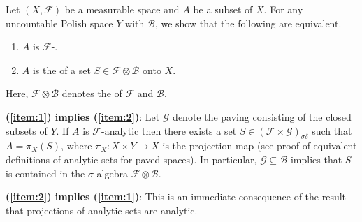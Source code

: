 \documentclass[12pt]{article}
\begin{document}

Let $(X,\mathcal{F})$ be a measurable space and $A$ be a subset of $X$. For any uncountable Polish space $Y$ with  $\mathcal{B}$, we show that the following are equivalent.
\begin{enumerate}
\item\label{item:1} $A$ is $\mathcal{F}$-.
\item\label{item:2} $A$ is the  of a set $S\in\mathcal{F}\otimes\mathcal{B}$ onto $X$.
\end{enumerate}
Here, $\mathcal{F}\otimes\mathcal{B}$ denotes the  of $\mathcal{F}$ and $\mathcal{B}$.

\noindent\textbf{(\ref{item:1}) implies (\ref{item:2})}:
Let $\mathcal{G}$ denote the paving consisting of the closed subsets of $Y$. If $A$ is $\mathcal{F}$-analytic then there exists a set $S\in(\mathcal{F}\times\mathcal{G})_{\sigma\delta}$ such that $A=\pi_X(S)$, where $\pi_X\colon X\times Y\to X$ is the projection map (see proof of equivalent definitions of analytic sets for paved spaces).
In particular, $\mathcal{G}\subseteq\mathcal{B}$ implies that $S$ is contained in the $\sigma$-algebra $\mathcal{F}\otimes\mathcal{B}$.

\noindent\textbf{(\ref{item:2}) implies (\ref{item:1})}:
This is an immediate consequence of the result that projections of analytic sets are analytic.

\end{document}
